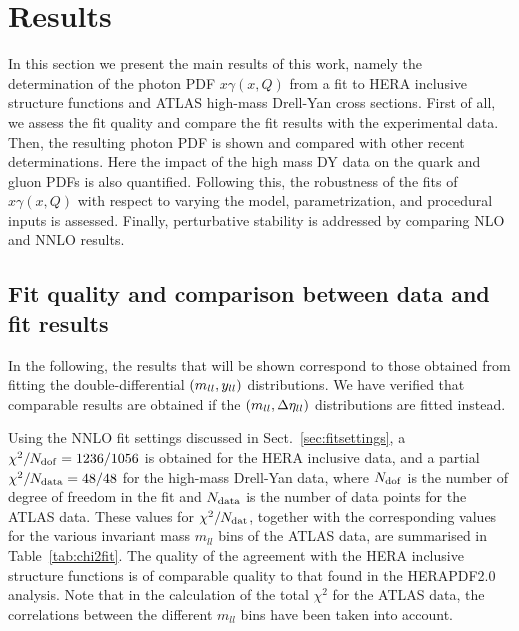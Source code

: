 \section{Results}
\label{sec:results}

In this section we present the main results of this work,
namely the
determination of the photon PDF $x\gamma(x,Q)$ from a fit to 
HERA inclusive structure functions and ATLAS high-mass Drell-Yan cross sections.
%
First of all,
we assess the fit quality and compare the fit results
with the experimental data.
%
Then, the resulting photon PDF is shown and compared with other
recent determinations.
%
Here the impact of the high mass DY data on
the quark and gluon PDFs is also quantified.
%
Following this,
the robustness of the fits of $x\gamma(x,Q)$
with respect to varying the model, parametrization, and procedural
inputs is assessed.
%
Finally, perturbative stability is addressed by comparing NLO and
NNLO results.

\subsection{Fit quality and comparison between data and fit results}

In the following, the results that will be shown
correspond to those obtained from fitting the
double-differential $\left( m_{ll},y_{ll}\right)$ distributions.
%
We have verified that comparable results are obtained if the
$\left( m_{ll},\Delta\eta_{ll}\right)$ distributions are fitted instead.

Using the NNLO fit settings discussed in Sect.~\ref{sec:fitsettings},
a $\chi^{2}/N_{\rm dof} = 1236/1056$ is obtained
for the HERA inclusive data, and a partial
$\chi^2/N_{\rm data} = 48/48$ for the high-mass Drell-Yan data,
where $N_{\rm dof}$ is the number of degree of freedom in the fit and 
$N_{\rm data}$  is the number of data points for the ATLAS data.
%
These values for  $\chi^{2}/N_{\rm dat}$, together
with the corresponding values for the various
invariant mass $m_{ll}$ bins of the ATLAS  data,
are summarised in
Table~\ref{tab:chi2fit}.
%
The quality of the agreement with the HERA inclusive structure
functions is of comparable quality to that found in the HERAPDF2.0 analysis.
%
Note that in the calculation of the total $\chi^2$ for the
ATLAS data, the correlations between the
different $m_{ll}$ bins have been taken into account.

